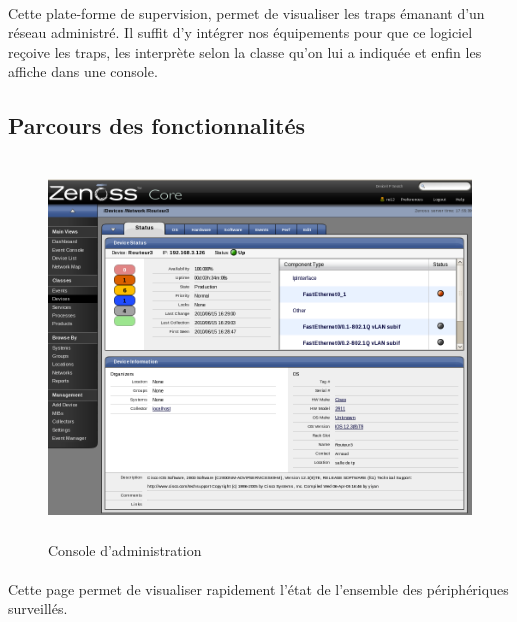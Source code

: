 \documentclass[12pt,a4paper,notitlepage]{article}
\begin{document}
\paragraph{}Cette plate-forme de supervision, permet de visualiser les traps émanant d'un réseau administré. Il suffit d'y intégrer nos équipements pour que ce logiciel reçoive les traps, les interprète selon la classe qu'on lui a indiquée et enfin les affiche dans une console.

\subsection{Parcours des fonctionnalités}


\begin{figure}[!h]
\begin{center}
\includegraphics[height=10cm]{zenoss_interface}
\caption{Console d'administration}
\label{fig:da}
\end{center}
\end{figure}

\paragraph{} Cette page permet de visualiser rapidement l'état de l'ensemble des périphériques surveillés.
\end{document}
